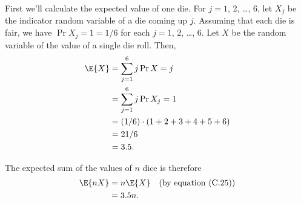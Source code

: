 First we'll calculate the expected value of one die.
For $j=1$, 2, \dots, 6, let $X_j$ be the indicator random variable of a die coming up $j$.
Assuming that each die is fair, we have $\Pr{X_j=1}=1/6$ for each $j=1$, 2, \dots, 6.
Let $X$ be the random variable of the value of a single die roll.
Then,
\begin{align*}
    \E{X} &= \sum_{j=1}^6j\Pr{X=j} \\
    &= \sum_{j=1}^6j\Pr{X_j=1} \\
    &= (1/6)\cdot(1+2+3+4+5+6) \\
    &= 21/6 \\
    &= 3.5.
\end{align*}

The expected sum of the values of $n$ dice is therefore
\begin{align*}
    \E{nX} &= n\E{X} && \text{(by equation (C.25))} \\
    &= 3.5n.
\end{align*}
